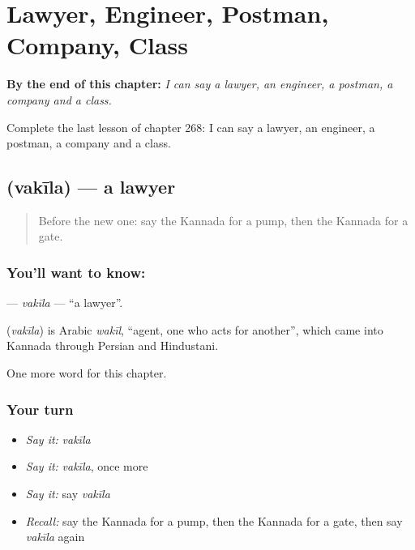 
\chapter{Lawyer, Engineer, Postman, Company, Class}
\label{ch:ka-lawyer-engineer-postman-company-class}

\begin{chapteropening}
\textbf{By the end of this chapter:} \emph{I can say a lawyer, an engineer, a postman, a company and a class.}

Complete the last lesson of chapter 268: I can say a lawyer, an engineer, a postman, a company and a class.
\end{chapteropening}

\section[\texorpdfstring{\kn{ವಕೀಲ} (vakīla)}{ವಕೀಲ (vakīla)}]{ (vakīla) — a lawyer}

\label{lesson:KA-C268-vakila}



\begin{quote}
Before the new one: say the Kannada for a pump, then the Kannada for a gate.
\end{quote}

\subsection*{You'll want to know: }
\textbf{} — \emph{vakīla} — \textquotedblleft{}a lawyer\textquotedblright{}.

\begin{cousinweb}
\textbf{} (\emph{vakīla}) is Arabic \emph{wakīl}, \textquotedblleft{}agent, one who acts for another\textquotedblright{}, which came into Kannada through Persian and Hindustani.
\end{cousinweb}

\begin{grammarlens}[title={What you've built}]
One more word for this chapter.
\end{grammarlens}

\subsection*{Your turn}
\begin{itemize}
\raggedright
  \item \emph{Say it:} \emph{vakīla}
  \item \emph{Say it:} \emph{vakīla}, once more
  \item \emph{Say it:} say \emph{vakīla}
  \item \emph{Recall:} say the Kannada for a pump, then the Kannada for a gate, then say \emph{vakīla} again
\end{itemize}

